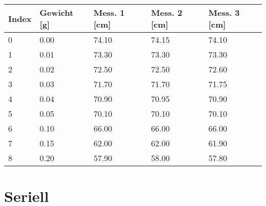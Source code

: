 \documentclass[../main.tex]{subfiles} %
\begin{document}
    \begin{center}
        \begin{tabular}{ |l|l|l|l|l| } \hline\rowcolor{Gray!50}
            Index & Gewicht [g] & Mess. 1 [cm] & Mess. 2 [cm] & Mess. 3 [cm] \\\toprule\hline
            0     & 0.00        & 74.10        & 74.15        & 74.10        \\\hline
            1     & 0.01        & 73.30        & 73.30        & 73.30        \\\hline
            2     & 0.02        & 72.50        & 72.50        & 72.60        \\\hline
            3     & 0.03        & 71.70        & 71.70        & 71.75        \\\hline
            4     & 0.04        & 70.90        & 70.95        & 70.90        \\\hline
            5     & 0.05        & 70.10        & 70.10        & 70.10        \\\hline
            6     & 0.10        & 66.00        & 66.00        & 66.00        \\\hline
            7     & 0.15        & 62.00        & 62.00        & 61.90        \\\hline
            8     & 0.20        & 57.90        & 58.00        & 57.80        \\\hline
        \end{tabular}
    \end{center}

    \section{Seriell}\label{sec:seriell}
\end{document}
